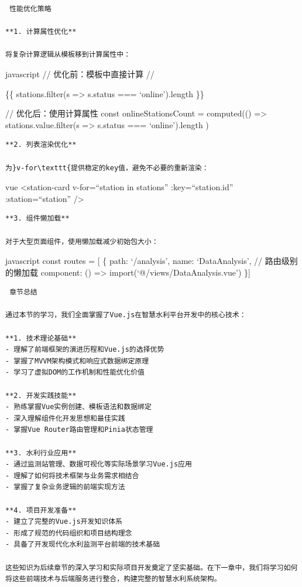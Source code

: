 {{\begin{lstlisting}
 性能优化策略

**1. 计算属性优化**

将复杂计算逻辑从模板移到计算属性中：
\end{lstlisting}

javascript // 优化前：模板中直接计算 //

\{\{ stations.filter(s =\textgreater{} s.status === `online').length \}\}

// 优化后：使用计算属性 const onlineStationsCount = computed(() =\textgreater{} stations.value.filter(s =\textgreater{} s.status === `online').length )

\begin{lstlisting}
**2. 列表渲染优化**

为}v-for\texttt{提供稳定的key值，避免不必要的重新渲染：
\end{lstlisting}

vue \textless station-card v-for=``station in stations'' :key=``station.id''\\
:station=``station'' /\textgreater{}

\begin{lstlisting}
**3. 组件懒加载**

对于大型页面组件，使用懒加载减少初始包大小：
\end{lstlisting}

javascript const routes = {[} \{ path: `/analysis', name: `DataAnalysis', // 路由级别的懒加载 component: () =\textgreater{} import(`@/views/DataAnalysis.vue') \}{]}

\begin{lstlisting}
 章节总结

通过本节的学习，我们全面掌握了Vue.js在智慧水利平台开发中的核心技术：

**1. 技术理论基础**
- 理解了前端框架的演进历程和Vue.js的选择优势
- 掌握了MVVM架构模式和响应式数据绑定原理
- 学习了虚拟DOM的工作机制和性能优化价值

**2. 开发实践技能**
- 熟练掌握Vue实例创建、模板语法和数据绑定
- 深入理解组件化开发思想和最佳实践
- 掌握Vue Router路由管理和Pinia状态管理

**3. 水利行业应用**
- 通过监测站管理、数据可视化等实际场景学习Vue.js应用
- 理解了如何将技术框架与业务需求相结合
- 掌握了复杂业务逻辑的前端实现方法

**4. 项目开发准备**
- 建立了完整的Vue.js开发知识体系
- 形成了规范的代码组织和项目结构理念
- 具备了开发现代化水利监测平台前端的技术基础

这些知识为后续章节的深入学习和实际项目开发奠定了坚实基础。在下一章中，我们将学习如何将这些前端技术与后端服务进行整合，构建完整的智慧水利系统架构。



\end{lstlisting}}}
